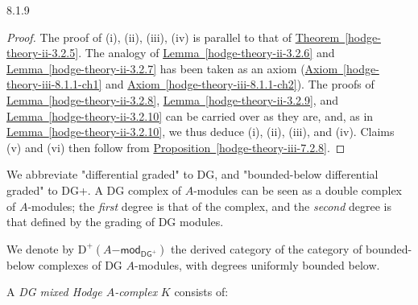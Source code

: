 \begin{scholium}{8.1.9}
\begin{enumerate}
  \end{enumerate}\begin{proof}\par{}The proof of (i), (ii), (iii), (iv) is parallel to that of \hyperref[hodge-theory-ii-3.2.5]{Theorem~\ref*{hodge-theory-ii-3.2.5}}.
      The analogy of \hyperref[hodge-theory-ii-3.2.6]{Lemma~\ref*{hodge-theory-ii-3.2.6}} and \hyperref[hodge-theory-ii-3.2.7]{Lemma~\ref*{hodge-theory-ii-3.2.7}} has been taken as an axiom (\hyperref[hodge-theory-iii-8.1.1-ch1]{Axiom~\ref*{hodge-theory-iii-8.1.1-ch1}} and \hyperref[hodge-theory-iii-8.1.1-ch2]{Axiom~\ref*{hodge-theory-iii-8.1.1-ch2}}).
      The proofs of \hyperref[hodge-theory-ii-3.2.8]{Lemma~\ref*{hodge-theory-ii-3.2.8}}, \hyperref[hodge-theory-ii-3.2.9]{Lemma~\ref*{hodge-theory-ii-3.2.9}}, and \hyperref[hodge-theory-ii-3.2.10]{Lemma~\ref*{hodge-theory-ii-3.2.10}} can be carried over as they are, and, as in \hyperref[hodge-theory-ii-3.2.10]{Lemma~\ref*{hodge-theory-ii-3.2.10}}, we thus deduce (i), (ii), (iii), and (iv).
      Claims (v) and (vi) then follow from \hyperref[hodge-theory-iii-7.2.8]{Proposition~\ref*{hodge-theory-iii-7.2.8}}.\end{proof}\end{scholium}\label{hodge-theory-iii-8.1.10}\par{}We abbreviate "differential graded" to DG, and "bounded-below differential graded" to DG+.
    A DG complex of \(A\)-modules can be seen as a double complex of \(A\)-modules;
    the \emph{first} degree is that of the complex, and the \emph{second} degree is that defined by the grading of DG modules.
    
    We denote by \(\mathrm {D}^+(A\mathsf {-mod}_{\mathsf {DG}^+})\) the derived category of the category of bounded-below complexes of DG \(A\)-modules, with degrees uniformly bounded below.\par{}A \emph{DG mixed Hodge \(A\)-complex} \(K\) consists of:

